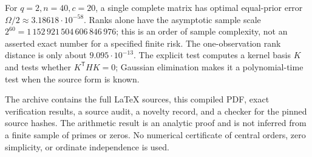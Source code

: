 For $q=2,n=40,c=20$, a single complete matrix has optimal equal-prior error
$\Omega/2\approx3.18618\cdot10^{-58}$. Ranks alone have the asymptotic
sample scale $2^{60}=1\,152\,921\,504\,606\,846\,976$; this is an order of
sample complexity, not an asserted exact number for a specified finite risk.
The one-observation rank distance is only about $9.095\cdot10^{-13}$.
The explicit test computes a kernel basis $K$ and tests whether
$K^{\mathsf T}HK=0$; Gaussian elimination makes it a polynomial-time test
when the source form is known.

The archive contains the full LaTeX sources, this compiled PDF, exact
verification results, a source audit, a novelty record, and a checker for the
pinned source hashes. The arithmetic result is an analytic proof and is not
inferred from a finite sample of primes or zeros. No numerical certificate
of central orders, zero simplicity, or ordinate independence is used.

